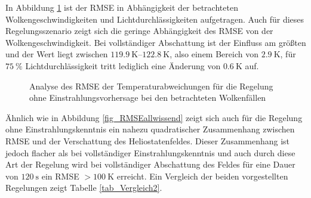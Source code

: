In Abbildung \ref{fig_RMSE3Dunwissend} ist der RMSE in Abhängigkeit der betrachteten Wolkengeschwindigkeiten und Lichtdurchlässigkeiten aufgetragen.
Auch für dieses Regelungsszenario zeigt sich die geringe Abhängigkeit des RMSE von der Wolkengeschwindigkeit.
Bei vollständiger Abschattung ist der Einfluss am größten und der Wert liegt zwischen $\SIrange{119.9}{122.8}{\kelvin}$, also einem Bereich von $\SI{2.9}{\kelvin}$, für $\SI{75}{\percent}$ Lichtdurchlässigkeit tritt lediglich eine Änderung von $\SI{0.6}{\kelvin}$ auf.

\begin{figure}[h!]
    \centering
    \setlength{\fboxsep}{1pt}
    \setlength{\fboxrule}{1pt}
\caption[Analyse des RMSE der Temperaturabweichungen für die Regelung ohne Einstrahlungsvorhersage bei den betrachteten Wolkenfällen]{Analyse des RMSE der Temperaturabweichungen für die Regelung ohne Einstrahlungsvorhersage bei den betrachteten Wolkenfällen}
    \label{fig_RMSE3Dunwissend}
\end{figure}

Ähnlich wie in Abbildung \ref{fig_RMSEallwissend} zeigt sich auch für die Regelung ohne Einstrahlungskenntnis ein nahezu quadratischer Zusammenhang zwischen RMSE und der Verschattung des Heliostatenfeldes.
Dieser Zusammenhang ist jedoch flacher als bei vollständiger Einstrahlungskenntnis und auch durch diese Art der Regelung wird bei vollständiger Abschattung des Feldes für eine Dauer von $\SI{120}{\second}$ ein RMSE $>\SI{100}{\kelvin}$ erreicht.
Ein Vergleich der beiden vorgestellten Regelungen zeigt Tabelle \ref{tab_Vergleich2}.

